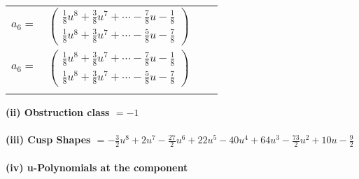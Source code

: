 \documentclass[1p]{elsarticle_modified}
\theoremstyle{definition}
\begin{document}
\begin{tabular}{m{7pt} m{180pt} m{7pt} m{180pt} }
\flushright $a_{6}=$&$\begin{pmatrix}\frac{1}{8} u^8+\frac{3}{8} u^7+\cdots-\frac{7}{8} u-\frac{1}{8}\\\frac{1}{8} u^8+\frac{3}{8} u^7+\cdots-\frac{5}{8} u-\frac{7}{8}\end{pmatrix}$\\ \flushright $a_{6}=$&$\begin{pmatrix}\frac{1}{8} u^8+\frac{3}{8} u^7+\cdots-\frac{7}{8} u-\frac{1}{8}\\\frac{1}{8} u^8+\frac{3}{8} u^7+\cdots-\frac{5}{8} u-\frac{7}{8}\end{pmatrix}$\\&\end{tabular}
\flushleft \textbf{(ii) Obstruction class $= -1$}\\~\\
\flushleft \textbf{(iii) Cusp Shapes $= -\frac{3}{2} u^8+2 u^7-\frac{27}{2} u^6+22 u^5-40 u^4+64 u^3-\frac{73}{2} u^2+10 u-\frac{9}{2}$}\\~\\
\newpage\renewcommand{\arraystretch}{1}
\flushleft \textbf{(iv) u-Polynomials at the component}\newline \\
\end{document}
